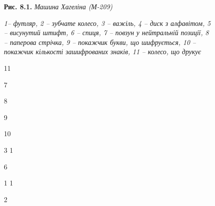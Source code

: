 \documentclass[a4paper]{article}
\newcounter{}
\begin{document}
\begin{figure}
\centering
\begin{minipage}{5.8043in}
{\centering
\textbf{Рис. 8.1.}\textit{ Машина Хагеліна (М-209)}
\par}


\bigskip

{\centering\itshape
1– футляр, 2 – зубчате колесо, 3 – важіль, 4 – диск з алфавітом,  5 – висунутий
штифт, 6 –  спиця, 7 – повзун у нейтральній позиції, 8 – паперова стрічка, 9 –
покажчик букви, що шифрується, 10 – покажчик кількості зашифрованих знаків, 11
–  колесо, що друкує
\par}


\bigskip
\end{minipage}
\end{figure}
\begin{figure}
\centering
\begin{minipage}{0.4043in}
11
\end{minipage}
\end{figure}
\begin{figure}
\centering
\begin{minipage}{0.4126in}
 7


\bigskip

 8


\bigskip


\bigskip

 9


\bigskip

 10


\bigskip


\bigskip
\end{minipage}
\end{figure}
\begin{figure}
\centering
\begin{minipage}{0.2835in}
3  1
\end{minipage}
\end{figure}
\begin{figure}
\centering
\begin{minipage}{0.2209in}
6
\end{minipage}
\end{figure}
\begin{figure}
\centering
\begin{minipage}{0.3335in}
1  1
\end{minipage}
\end{figure}
\begin{figure}
\centering
\begin{minipage}{0.1252in}
2
\end{minipage}
\end{figure}
\end{document}
